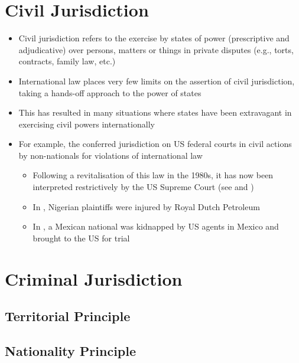 \section{Civil Jurisdiction}
\begin{itemize}
    \item Civil jurisdiction refers to the exercise by states of power (prescriptive and adjudicative) over persons, matters or things in private disputes (e.g., torts, contracts, family law, etc.)
    \item International law places very few limits on the assertion of civil jurisdiction, taking a hands-off approach to the power of states
    \item This has resulted in many situations where states have been extravagant in exercising civil powers internationally
    \item For example, the  conferred jurisdiction on US federal courts in civil actions by non-nationals for violations of international law
    \begin{itemize}
        \item Following a revitalisation of this law in the 1980s, it has now been interpreted restrictively by the US Supreme Court (see  and )
        \item In , Nigerian plaintiffs were injured by Royal Dutch Petroleum
        \item In , a Mexican national was kidnapped by US agents in Mexico and brought to the US for trial
    \end{itemize}
\end{itemize}

\section{Criminal Jurisdiction}

\subsection{Territorial Principle}

\subsection{Nationality Principle}


